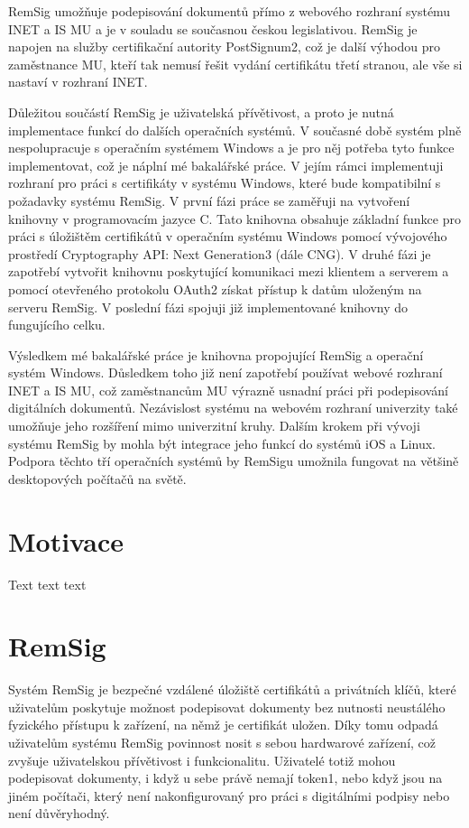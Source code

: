 \documentclass[]{fithesis3}
\begin{document}
RemSig umožňuje podepisování dokumentů přímo z webového rozhraní systému INET a IS MU a je v souladu se současnou českou legislativou. RemSig je napojen na služby certifikační autority PostSignum2, což je další výhodou pro zaměstnance MU, kteří tak nemusí řešit vydání certifikátu třetí stranou, ale vše si nastaví v rozhraní INET.

Důležitou součástí RemSig je uživatelská přívětivost, a proto je nutná implementace funkcí do dalších operačních systémů. V současné době systém plně nespolupracuje s operačním systémem Windows a je pro něj potřeba tyto funkce implementovat, což je náplní mé bakalářské práce. V jejím rámci implementuji rozhraní pro práci s certifikáty v systému Windows, které bude kompatibilní s požadavky systému RemSig. V první fázi práce se zaměřuji na vytvoření knihovny v programovacím jazyce C. Tato knihovna obsahuje základní funkce pro práci s úložištěm certifikátů v operačním systému Windows pomocí vývojového prostředí Cryptography API: Next Generation3 (dále CNG). V druhé fázi je zapotřebí vytvořit knihovnu poskytující komunikaci mezi klientem a serverem a pomocí otevřeného protokolu OAuth2 získat přístup k datům uloženým na serveru RemSig. V poslední fázi spojuji již implementované knihovny do fungujícího celku.

Výsledkem mé bakalářské práce je knihovna propojující RemSig a operační systém Windows. Důsledkem toho již není zapotřebí používat webové rozhraní INET a IS MU, což zaměstnancům MU výrazně usnadní práci při podepisování digitálních dokumentů. Nezávislost systému na webovém rozhraní univerzity také umožňuje jeho rozšíření mimo univerzitní kruhy. Dalším krokem při vývoji systému RemSig by mohla být integrace jeho funkcí do systémů iOS a Linux. Podpora těchto tří operačních systémů by RemSigu umožnila fungovat na většině desktopových počítačů na světě.

\chapter{Motivace}

Text text text

\chapter{RemSig}

Systém RemSig je bezpečné vzdálené úložiště certifikátů a privátních klíčů, které uživatelům poskytuje možnost podepisovat dokumenty bez nutnosti neustálého fyzického přístupu k zařízení, na němž je certifikát uložen. Díky tomu odpadá uživatelům systému RemSig povinnost nosit s sebou hardwarové zařízení, což zvyšuje uživatelskou přívětivost i funkcionalitu. Uživatelé totiž mohou podepisovat dokumenty, i když u sebe právě nemají token1, nebo když jsou na jiném počítači, který není nakonfigurovaný pro práci s digitálními podpisy nebo není důvěryhodný.
\end{document}
